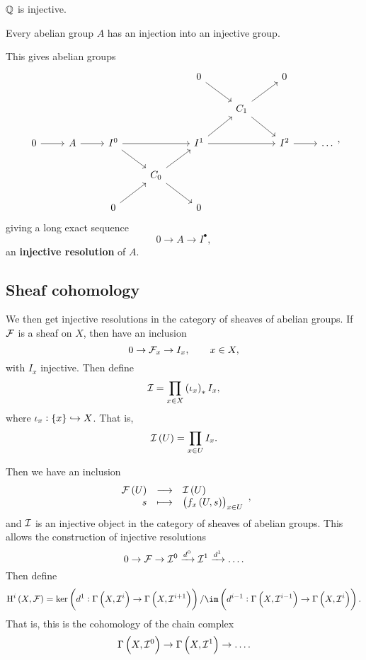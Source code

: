 \begin{example*}
$ \mathbb{Q} $ is injective.
\end{example*}

\begin{fact*}
Every abelian group $ A $ has an injection into an injective group.
\end{fact*}

This gives abelian groups
$$
\begin{tikzcd}
& & & & 0 \arrow{dr} & & 0 & \\
& & & & & C_1 \arrow{ur} \arrow{dr} & & \\
0 \arrow{r} & A \arrow{r} & I^0 \arrow{rr} \arrow{dr} & & I^1 \arrow{ur} \arrow{rr} & & I^2 \arrow{r} & \dots \\
& & & C_0 \arrow{ur} \arrow{dr} & & & & \\
& & 0 \arrow{ur} & & 0 & & &
\end{tikzcd},
$$
giving a long exact sequence
$$ 0 \to A \to I^\bullet, $$
an \textbf{injective resolution} of $ A $.

\subsection{Sheaf cohomology}

We then get injective resolutions in the category of sheaves of abelian groups. If $ \mathcal{F} $ is a sheaf on $ X $, then have an inclusion
$$ 0 \to \mathcal{F}_x \to I_x, \qquad x \in X, $$
with $ I_x $ injective. Then define
$$ \III = \prod_{x \in X} \br{\iota_x}_*I_x, $$
where $ \iota_x : \cbr{x} \hookrightarrow X $. That is,
$$ \III\br{U} = \prod_{x \in U} I_x. $$

\pagebreak

Then we have an inclusion
$$ \function{\FFF\br{U}}{\III\br{U}}{s}{\br{f_x\br{U, s}}_{x \in U}}, $$
and $ \mathcal{I} $ is an injective object in the category of sheaves of abelian groups. This allows the construction of injective resolutions
$$ 0 \to \mathcal{F} \to \mathcal{I}^0 \xrightarrow{d^0} \mathcal{I}^1 \xrightarrow{d^1} \dots. $$
Then define
$$ \H^i\br{X, \FFF} = \ker \br{d^1 : \Gamma\br{X, \III^i} \to \Gamma\br{X, \III^{i + 1}}} / \im \br{d^{i - 1} : \Gamma\br{X, \III^{i - 1}} \to \Gamma\br{X, \III^i}}. $$
That is, this is the cohomology of the chain complex
$$ \Gamma\br{X, \III^0} \to \Gamma\br{X, \III^1} \to \dots. $$

